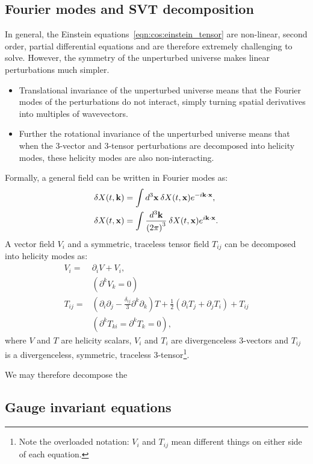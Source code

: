 \subsection{Fourier modes and SVT decomposition}
In general, the Einstein equations~\eqref{eqn:cos:einstein_tensor} are non-linear, second order, partial differential equations and are therefore extremely challenging to solve. However, the symmetry of the unperturbed universe makes linear perturbations much simpler. 
\begin{itemize}
  \item Translational invariance of the unperturbed universe means that the Fourier modes of the perturbations do not interact, simply turning spatial derivatives into multiples of wavevectors. 
  \item Further the rotational invariance of  the unperturbed universe means that when the 3-vector and 3-tensor perturbations are decomposed into helicity modes, these helicity modes are also non-interacting.
\end{itemize}
Formally, a general field can be written in Fourier modes as:
\begin{align}
  \delta X(t,\mathbf{k}) &= \int d^3\mathbf{x}\: \delta X(t,\mathbf{x}) e^{-i\mathbf{k} \cdot \mathbf{x}},\\
  \delta X(t,\mathbf{x}) &= \int \frac{d^3\mathbf{k}}{{(2\pi)}^3}\: \delta X(t,\mathbf{x}) e^{i\mathbf{k} \cdot \mathbf{x}}.
\end{align}
A vector field $V_i$ and a symmetric, traceless tensor field $T_{ij}$ can be decomposed into helicity modes as:
\begin{align}
  V_i =& \partial_i V + V_i,   \nonumber\\
  &(\partial^k V_k=0) \\
  T_{ij} =& (\partial_i\partial_j - \frac{\delta_{ij}}{3}\partial^k\partial_k)T + \frac{1}{2}(\partial_i T_j + \partial_j T_i) + T_{ij} \nonumber\\ 
  &(\partial^k T_{ki} = \partial^k T_k = 0),
\end{align}
where $V$ and $T$ are helicity scalars, $V_i$ and $T_i$ are divergenceless 3-vectors and $T_{ij}$ is a divergenceless, symmetric, traceless 3-tensor\footnote{Note the overloaded notation: $V_i$ and $T_{ij}$ mean different things on either side of each equation.}.

We may therefore decompose the 
\subsection{Gauge invariant equations}



